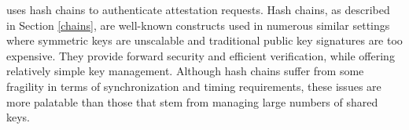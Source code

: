 \system uses hash chains to authenticate attestation requests. Hash chains, as described in Section 
\ref{chains}, are well-known constructs used in numerous similar settings where symmetric keys 
are unscalable and traditional public key signatures are too expensive.
They provide forward security and efficient verification, while offering relatively simple
key management. Although hash chains suffer from some fragility in terms of synchronization 
and timing requirements, these issues are more palatable than those that stem from managing 
large numbers of shared keys.

